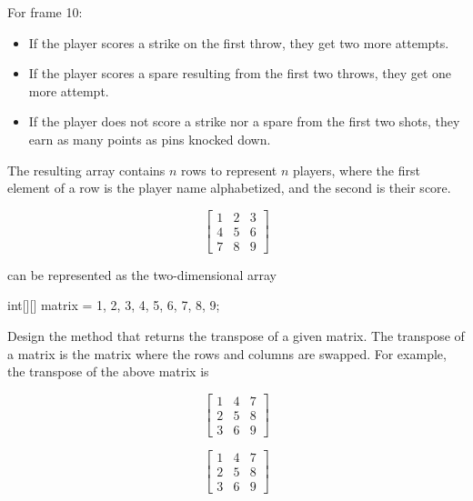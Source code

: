 For frame 10:
\begin{itemize}
    \item If the player scores a strike on the first throw, they get two more attempts.
    \item If the player scores a spare resulting from the first two throws, they get one more attempt.
    \item If the player does not score a strike nor a spare from the first two shots, they earn as many points as pins knocked down.
\end{itemize}

The resulting array contains $n$ rows to represent $n$ players, where the first element of a row is the player name alphabetized, and the second is their score.


\[
\begin{bmatrix}
    1 & 2 & 3\\
    4 & 5 & 6\\
    7 & 8 & 9
\end{bmatrix}
\]

\noindent can be represented as the two-dimensional array

\begin{verbnobox}[\small]
int[][] matrix = {{1, 2, 3}, {4, 5, 6}, {7, 8, 9}};
\end{verbnobox}

\noindent Design the  method that returns the transpose of a given matrix. The transpose of a matrix is the matrix where the rows and columns are swapped. For example, the transpose of the above matrix is

\[
\begin{bmatrix}
    1 & 4 & 7\\
    2 & 5 & 8\\
    3 & 6 & 9
\end{bmatrix}
\]


\[
\begin{bmatrix}
    1 & 4 & 7\\
    2 & 5 & 8\\
    3 & 6 & 9
\end{bmatrix}
\]

